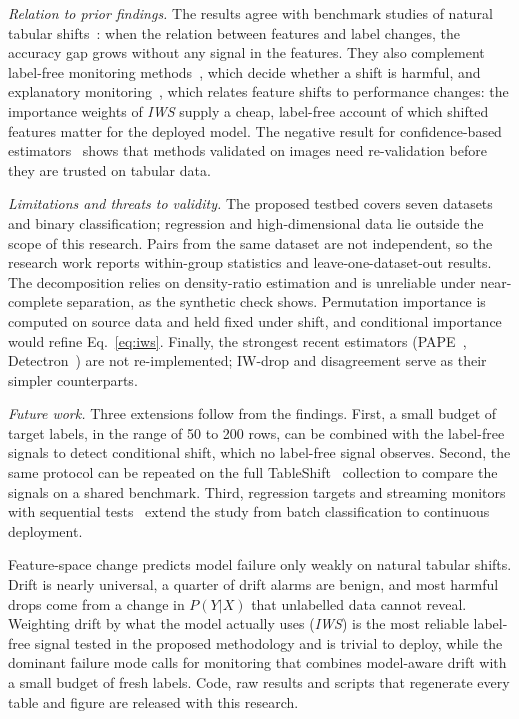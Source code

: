 \documentclass[conference]{IEEEtran}
\makeatletter
\def\section{\@startsection{section}{1}{\z@}{1.5ex plus 1.5ex minus 0.5ex}{0.7ex plus 1ex minus 0ex}{\normalfont\normalsize\centering\itshape}}
\theoremstyle{plainhead}
\newcommand{\iws}{\textit{IWS}}
\makeatother
\begin{document}
\textit{Relation to prior findings.} The results agree with benchmark studies of natural tabular shifts~\cite{liu2023need,gardner2023tableshift}: when the relation between features and label changes, the accuracy gap grows without any signal in the features. They also complement label-free monitoring methods~\cite{nguyen2025reliably,amoukou2024sequential}, which decide whether a shift is harmful, and explanatory monitoring~\cite{decker2024explanatory}, which relates feature shifts to performance changes: the importance weights of \iws{} supply a cheap, label-free account of which shifted features matter for the deployed model. The negative result for confidence-based estimators~\cite{deng2023confidence,xie2024mano} shows that methods validated on images need re-validation before they are trusted on tabular data.

\textit{Limitations and threats to validity.} The proposed testbed covers seven datasets and binary classification; regression and high-dimensional data lie outside the scope of this research. Pairs from the same dataset are not independent, so the research work reports within-group statistics and leave-one-dataset-out results. The decomposition relies on density-ratio estimation and is unreliable under near-complete separation, as the synthetic check shows. Permutation importance is computed on source data and held fixed under shift, and conditional importance~\cite{chamma2024variable} would refine Eq.~\eqref{eq:iws}. Finally, the strongest recent estimators (PAPE~\cite{bialek2025pape}, Detectron~\cite{ginsberg2023detectron}) are not re-implemented; IW-drop and disagreement serve as their simpler counterparts.

\textit{Future work.} Three extensions follow from the findings. First, a small budget of target labels, in the range of 50 to 200 rows, can be combined with the label-free signals to detect conditional shift, which no label-free signal observes. Second, the same protocol can be repeated on the full TableShift~\cite{gardner2023tableshift} collection to compare the signals on a shared benchmark. Third, regression targets and streaming monitors with sequential tests~\cite{amoukou2024sequential} extend the study from batch classification to continuous deployment.

\section{Conclusion}
Feature-space change predicts model failure only weakly on natural tabular shifts. Drift is nearly universal, a quarter of drift alarms are benign, and most harmful drops come from a change in $P(Y|X)$ that unlabelled data cannot reveal. Weighting drift by what the model actually uses (\iws{}) is the most reliable label-free signal tested in the proposed methodology and is trivial to deploy, while the dominant failure mode calls for monitoring that combines model-aware drift with a small budget of fresh labels. Code, raw results and scripts that regenerate every table and figure are released with this research.
\end{document}

